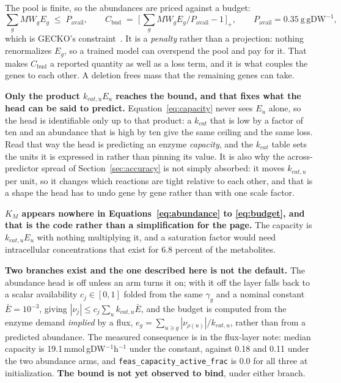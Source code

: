 The pool is finite, so the abundances are priced against a budget:
\begin{equation}
  \sum_g MW_g E_g \;\le\; P_{\mathrm{avail}},
  \qquad
  C_{\mathrm{bud}} \;=\; \Big[\,\sum_g MW_g E_g\big/P_{\mathrm{avail}} - 1\,\Big]_{+},
  \qquad P_{\mathrm{avail}} = 0.35\ \mathrm{g\,gDW^{-1}},
  \label{eq:budget}
\end{equation}
which is GECKO's constraint~\cite{chenReconstructionSimulationAnalysis2024}. It is a
\emph{penalty} rather than a projection: nothing
renormalizes $E_g$, so a trained model can overspend the pool and pay for it. That makes
$C_{\mathrm{bud}}$ a reported quantity as well as a loss term, and it is what couples the
genes to each other. A deletion frees mass that the remaining genes can take.

\textbf{Only the product $k_{cat,u}E_u$ reaches the bound, and that fixes what the head can
be said to predict.} Equation~\eqref{eq:capacity} never sees $E_u$ alone, so the head is
identifiable only up to that product: a $k_{cat}$ that is low by a factor of ten and an
abundance that is high by ten give the same ceiling and the same loss. Read that way the
head is predicting an enzyme \emph{capacity}, and the $k_{cat}$ table sets the units it is
expressed in rather than pinning its value. It is also why the across-predictor spread of
Section~\ref{sec:accuracy} is not simply absorbed: it moves $k_{cat,u}$ per unit, so it
changes which reactions are tight relative to each other, and that is a shape the head has
to undo gene by gene rather than with one scale factor.

\textbf{$K_M$ appears nowhere in Equations~\eqref{eq:abundance} to \eqref{eq:budget}, and
that is the code rather than a simplification for the page.} The capacity is
$k_{cat,u}E_u$ with nothing multiplying it, and a saturation factor would need
intracellular concentrations that exist for 6.8 percent of the metabolites.

\textbf{Two branches exist and the one described here is not the default.} The abundance
head is off unless an arm turns it on; with it off the layer falls back to a scalar
availability $c_j \in [0,1]$ folded from the same $\gamma_g$ and a nominal constant
$\bar E = 10^{-3}$, giving $|\nu_j| \le c_j \sum_u k_{cat,u}\bar E$, and the budget is
computed from the enzyme demand \emph{implied} by a flux,
$e_g = \sum_{u \ni g} |\nu_{\rho(u)}| / k_{cat,u}$, rather than from a predicted abundance.
The measured consequence is in the flux-layer note: median capacity is
19.1\,mmol\,gDW$^{-1}$h$^{-1}$ under the constant, against 0.18 and 0.11 under the two
abundance arms, and \texttt{feas\_capacity\_active\_frac} is 0.0 for all three at
initialization. \textbf{The bound is not yet observed to bind}, under either branch.

